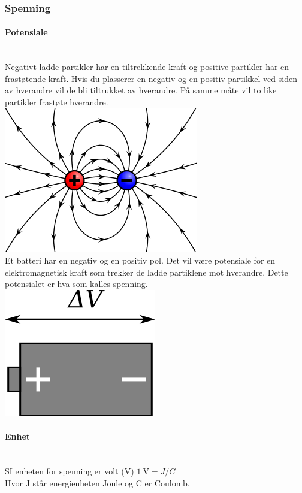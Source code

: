 \subsubsection{Spenning}
\paragraph{Potensiale} \mbox{} \\
Negativt ladde partikler har en tiltrekkende kraft
og positive partikler har en frastøtende kraft.
Hvis du plasserer en negativ og en positiv partikkel ved siden av
hverandre vil de bli tiltrukket av hverandre. På samme måte
vil to like partikler frastøte hverandre.
\\
\includegraphics[scale=0.5]{./img/charge}
\\

Et batteri har en negativ og en positiv pol.
Det vil være potensiale for en elektromagnetisk kraft
som trekker de ladde partiklene mot hverandre.
Dette potensialet er hva som kalles spenning.
\\
\includegraphics[scale=0.5]{./img/battery}

\paragraph{Enhet} \mbox{} \\
SI enheten for spenning er volt (V) \hfill $\SI{1}{\volt} = J/C$\\
Hvor J står energienheten Joule og C er Coulomb.
